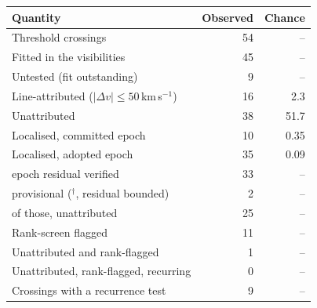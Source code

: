 \begin{tabular}{@{}lrr@{}}
\hline
Quantity & Observed & Chance \\
\hline
Threshold crossings & 54 & -- \\
Fitted in the visibilities & 45 & -- \\
Untested (fit outstanding) & 9 & -- \\
Line-attributed ($|\Delta v|\leq50$\,km\,s$^{-1}$) & 16 & 2.3 \\
Unattributed & 38 & 51.7 \\
Localised, committed epoch & 10 & 0.35 \\
Localised, adopted epoch & 35 & 0.09 \\
\quad epoch residual verified & 33 & -- \\
\quad provisional ($^{\dagger}$, residual bounded) & 2 & -- \\
\quad of those, unattributed & 25 & -- \\
Rank-screen flagged & 11 & -- \\
Unattributed and rank-flagged & 1 & -- \\
Unattributed, rank-flagged, recurring & 0 & -- \\
Crossings with a recurrence test & 9 & -- \\
\hline
\end{tabular}
